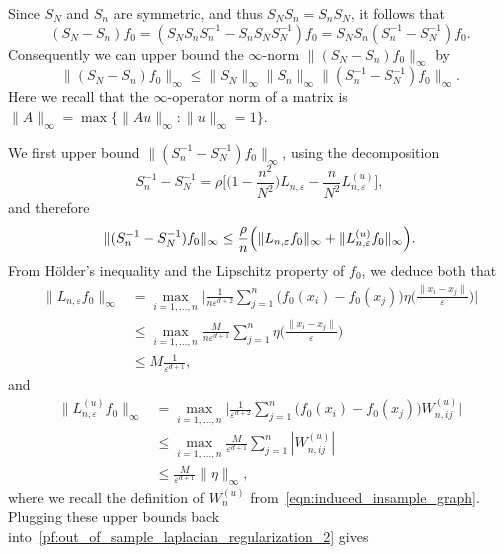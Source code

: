 \documentclass{article}
\newcommand{\1}{\mathbf{1}}
\theoremstyle{alden}
\theoremstyle{aldenthm}
\theoremstyle{definition}
\theoremstyle{remark}
\begin{document}
Since $S_N$ and $S_n$ are symmetric, and thus $S_NS_n = S_nS_N$, it follows that
\begin{equation*}
(S_N - S_n)f_0 = (S_NS_nS_n^{-1} - S_nS_NS_N^{-1})f_0 = S_N S_n(S_n^{-1} - S_N^{-1})f_0.
\end{equation*}
Consequently we can upper bound the $\infty$-norm $\|(S_N - S_n)f_0\|_{\infty}$ by
\begin{equation*}
\|(S_N - S_n)f_0\|_{\infty} \leq \|S_N\|_{\infty} \|S_n\|_{\infty} \|(S_n^{-1} - S_N^{-1})f_0\|_{\infty}.
\end{equation*}
Here we recall that the $\infty$-operator norm of a matrix is $\|A\|_{\infty} = \max\{\|Au\|_{\infty}:\|u\|_{\infty} = 1\}$. 

We first upper bound $\|(S_n^{-1} - S_N^{-1})f_0\|_{\infty}$, using the decomposition
\begin{equation*}
S_n^{-1} - S_N^{-1} = \rho \biggl[\biggl(1 - \frac{n^2}{N^2}\biggr)L_{n,\varepsilon} - \frac{n}{N^2}L_{n,\varepsilon}^{(u)}\biggr],
\end{equation*}
and therefore
\begin{equation}
\label{pf:out_of_sample_laplacian_regularization_2}
\|(S_n^{-1} - S_N^{-1})f_0\|_{\infty} \leq \frac{\rho}{n} \Bigl(\|L_{n,\varepsilon}f_0\|_{\infty} + \|L_{n,\varepsilon}^{(u)}f_0\|_{\infty} \Bigr).
\end{equation}
From H\"{o}lder's inequality and the Lipschitz property of $f_0$, we deduce both that
\begin{align*}
\|L_{n,\varepsilon}f_0\|_{\infty} & = \max_{i = 1,\ldots,n} \biggl| \frac{1}{n\varepsilon^{d + 2}}\sum_{j = 1}^{n} \bigl(f_0(x_i) - f_0(x_j)\bigr) \eta\biggl(\frac{\|x_i - x_j\|}{\varepsilon}\biggr) \biggr| \\
& \leq \max_{i = 1,\ldots,n}  \frac{M}{n\varepsilon^{d + 1}}\sum_{j = 1}^{n} \eta\biggl(\frac{\|x_i - x_j\|}{\varepsilon}\biggr) \\
& \leq M\frac{1}{\varepsilon^{d + 1}},
\end{align*}
and
\begin{align*}
\|L_{n,\varepsilon}^{(u)}f_0\|_{\infty} & = \max_{i = 1,\ldots,n} \biggl| \frac{1}{\varepsilon^{d + 2}} \sum_{j = 1}^{n} \bigl(f_0(x_i) - f_0(x_j)\bigr) W_{n,ij}^{(u)}\biggr| \\
& \leq \max_{i = 1,\ldots,n} \frac{M}{\varepsilon^{d + 1}} \sum_{j = 1}^{n} |W_{n,ij}^{(u)}|\\
& \leq \frac{M}{\varepsilon^{d + 1}} \|\eta\|_{\infty},
\end{align*}
where we recall the definition of $W_{n}^{(u)}$ from~\eqref{eqn:induced_insample_graph}. Plugging these upper bounds back into~\eqref{pf:out_of_sample_laplacian_regularization_2} gives
\end{document}
